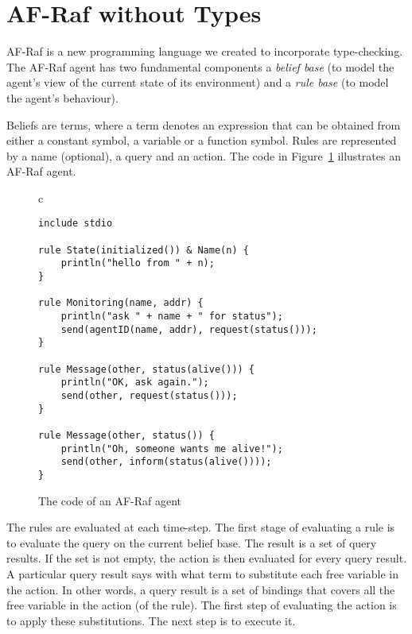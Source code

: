 \documentclass[preprint]{sigplanconf} %
\theoremstyle{remark}
\begin{document}
\section{AF-Raf without Types} \label{sec:af-raf} %

AF-Raf is a new programming language we created to incorporate
type-checking. The AF-Raf agent has two fundamental components a
\textit{belief base} (to model the agent's view of the current state of its
environment) and a \textit{rule base} (to model the agent's behaviour).

Beliefs are terms, where a term denotes an expression that can be obtained
from either a constant symbol, a variable or a function symbol. Rules are
represented by a name (optional), a query and an action.  The code in
Figure~\ref{fig:AF-Raf} illustrates an AF-Raf agent.


\begin{figure}\footnotesize %
\begin{center}
\begin{tabular}{c}
\begin{lstlisting}[style=hs]
include stdio

rule State(initialized()) & Name(n) {
    println("hello from " + n);
}

rule Monitoring(name, addr) {
    println("ask " + name + " for status");
    send(agentID(name, addr), request(status()));
}

rule Message(other, status(alive())) {
    println("OK, ask again.");
    send(other, request(status()));
}

rule Message(other, status()) {
    println("Oh, someone wants me alive!");
    send(other, inform(status(alive())));
}
\end{lstlisting}
\end{tabular}
\end{center}
\caption{The code of an AF-Raf agent}
\label{fig:AF-Raf}
\end{figure} %

The rules are evaluated at each time-step. The first stage of evaluating a
rule is to evaluate the query on the current belief base. The result is a
set of query results. If the set is not empty, the action is then evaluated
for every query result. A particular query result says with what term to
substitute each free variable in the action. In other words, a query result
is a set of bindings that covers all the free variable in the action (of
the rule). The first step of evaluating the action is to apply these
substitutions. The next step is to execute it.
\end{document}
